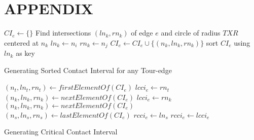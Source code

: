 \documentclass{llncs}
\begin{document}
\section*{APPENDIX}
\begin{algorithm}[h!]%
	\begin{spacing}{1}
	\begin{algorithmic}[1]
			\State $CI_e \leftarrow \{\}$
				\State Find intersections $(ln_k,rn_k)$ of edge $e$ and circle of radius $TXR$
				centered at $n_k$
					\State $ln_k \leftarrow n_i$
				\EndIf
					\State $rn_k \leftarrow n_j$
				\EndIf
				\State $CI_e \leftarrow CI_e \cup \{(n_k,ln_k,rn_k)\}$
			\EndFor 
			\State sort $CI_e$ using $ln_k$ as key
	\end{algorithmic}
	\end{spacing}
	\caption{Generating Sorted Contact Interval for any Tour-edge}
	\label{algo:sorted_contact_interval}
\end{algorithm}
\begin{algorithm}[h!]%
	\begin{spacing}{1}
	\begin{algorithmic}[1]
			\State $(n_t, ln_t, rn_t) \leftarrow firstElementOf(CI_e)$
			\State $lcci_e \leftarrow rn_t$
			\State $(n_k, ln_k, rn_k) \leftarrow nextElementOf(CI_e) $
					\State $lcci_e \leftarrow rn_k$
				\EndIf
				\State $(n_k, ln_k, rn_k) \leftarrow nextElementOf(CI_e) $
			\EndWhile
			\State $(n_s, ln_s, rn_s) \leftarrow lastElementOf(CI_e)$
			\State $rcci_e \leftarrow ln_s$
				\State $rcci_e \leftarrow lcci_e$
			\EndIf
	\end{algorithmic}
	\end{spacing}
	\caption{Generating Critical Contact Interval}
	\label{algo:CCI_list_scanner}
\end{algorithm}
\end{document}
